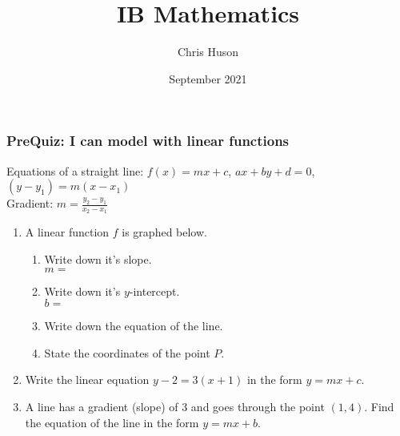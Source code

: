 \documentclass[12pt, twoside]{article}
\title{IB Mathematics}
\author{Chris Huson}
\date{September 2021}
\begin{document}
\subsubsection*{PreQuiz: I can model with linear functions}
Equations of a straight line: $f(x)=mx+c$, $ax+by+d=0$, $(y-y_1)=m(x-x_1)$\\[0.25cm]
Gradient: $\displaystyle m=\frac{y_2-y_1}{x_2-x_1}$ \vspace{1cm}
\begin{enumerate}
\item A linear function $f$ is graphed below.
\begin{multicols}{2}
\begin{enumerate}
  \item Write down it's slope.\\ $m=$
  \vspace{0.25cm}
  \item Write down it's $y$-intercept.\\ $b=$
  \vspace{0.25cm}
  \item Write down the equation of the line.
  \vspace{1cm}
  \item State the coordinates of the point $P$.
\end{enumerate} \vspace{.5cm}
  \begin{center} 
  \end{center}
\end{multicols}

\item Write the linear equation $y-2=3(x+1)$ in the form $y=mx+c$. \vspace{4cm}

\item A line has a gradient (slope) of 3 and goes through the point $(1, 4)$. Find the equation of the line in the form $y=mx+b$.


\end{enumerate}
\end{document}
